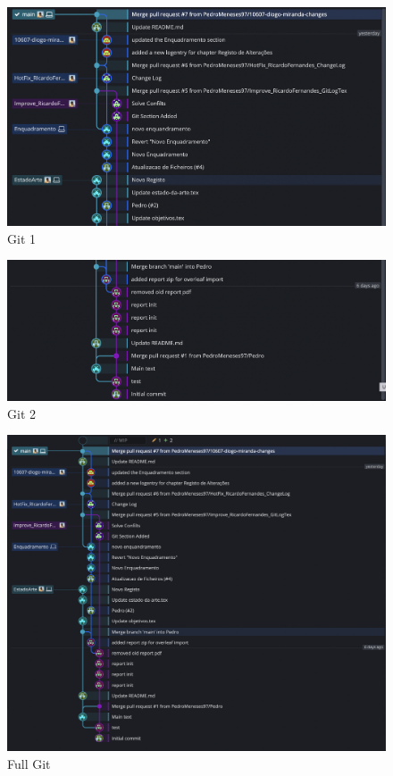 \begin{figure}[H]
	\begin{center}
		\includegraphics[width=1.0\textwidth]{chapter/image/git1.png}
	\end{center}
		\caption{Git 1}
		\label{fig:git-pic1}
\end{figure}



\begin{figure}[H]
	\begin{center}
		\includegraphics[width=1.0\textwidth]{chapter/image/git2.png}
	\end{center}
		\caption{Git 2}
		\label{fig:git-pic2}
\end{figure}



\begin{figure}[H]
	\begin{center}
		\includegraphics[width=1.0\textwidth]{chapter/image/git3.png}
	\end{center}
		\caption{Full Git}
		\label{fig:git-pic3}
\end{figure}

